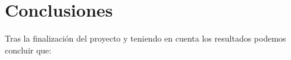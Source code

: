 \chapter{Conclusiones}

Tras la finalización del proyecto y teniendo en cuenta los resultados podemos concluir que:

\begin{itemize}
\end{itemize}